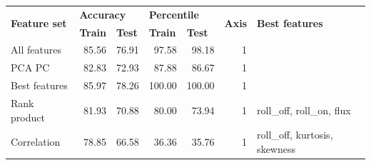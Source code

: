 \begin{table}[]
\begin{tabular}{|l|rr|rr|r|l|}
\hline
\multirow{2}{*}{\textbf{Feature set}} & \multicolumn{2}{l|}{\textbf{Accuracy}}                                   & \multicolumn{2}{l|}{\textbf{Percentile}}                                 & \multicolumn{1}{l|}{\multirow{2}{*}{\textbf{Axis}}} & \multirow{2}{*}{\textbf{Best features}} \\ \cline{2-5}
                                      & \multicolumn{1}{l|}{\textbf{Train}} & \multicolumn{1}{l|}{\textbf{Test}} & \multicolumn{1}{l|}{\textbf{Train}} & \multicolumn{1}{l|}{\textbf{Test}} & \multicolumn{1}{l|}{}                               &                                         \\ \hline
All features                          & \multicolumn{1}{r|}{85.56}          & 76.91                              & \multicolumn{1}{r|}{97.58}          & 98.18                              & 1                                                   &                                         \\ \hline
PCA PC                                & \multicolumn{1}{r|}{82.83}          & 72.93                              & \multicolumn{1}{r|}{87.88}          & 86.67                              & 1                                                   &                                         \\ \hline
Best features                         & \multicolumn{1}{r|}{85.97}          & 78.26                              & \multicolumn{1}{r|}{100.00}         & 100.00                             & 1                                                   &                                         \\ \hline
Rank product                          & \multicolumn{1}{r|}{81.93}          & 70.88                              & \multicolumn{1}{r|}{80.00}          & 73.94                              & 1                                                   & roll\_off, roll\_on, flux               \\ \hline
Correlation                           & \multicolumn{1}{r|}{78.85}          & 66.58                              & \multicolumn{1}{r|}{36.36}          & 35.76                              & 1                                                   & roll\_off, kurtosis, skewness           \\ \hline

\end{tabular}
\end{table}
